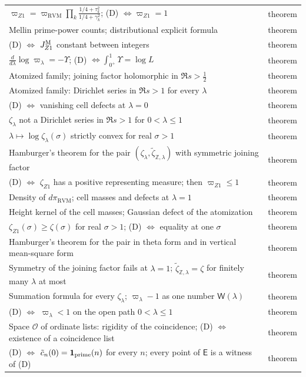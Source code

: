 \documentclass[11pt,reqno]{amsart}
\numberwithin{equation}{section}
\theoremstyle{plain}
\theoremstyle{definition}
\theoremstyle{remark}
\newcommand{\Z}{\mathbb Z}
\newcommand{\RVM}{\mathrm{RVM}}
\begin{document}
\begin{longtable}{p{}p{}}
$\varpi_{Z1}=\varpi_{\RVM}\prod_k\frac{1/4+\tau_k^2}{1/4+\gamma_k^2}$; (D) $\Leftrightarrow\varpi_{Z1}=1$ & theorem\\
Mellin prime-power counts; distributional explicit formula & theorem\\
(D) $\Leftrightarrow$ $J_{Z1}^{\rm M}$ constant between integers & theorem\\
$\frac d{d\lambda}\log\varpi_\lambda=-\Upsilon$; (D) $\Leftrightarrow\int_{0^+}^1\Upsilon=\log L$ & theorem\\
Atomized family; joining factor holomorphic in $\Re s>\frac12$ & theorem\\
Atomized family: Dirichlet series in $\Re s>1$ for every $\lambda$ & theorem\\
(D) $\Leftrightarrow$ vanishing cell defects at $\lambda=0$ & theorem\\
$\zeta_\lambda$ not a Dirichlet series in $\Re s>1$ for $0<\lambda\le1$ & theorem\\
$\lambda\mapsto\log\zeta_\lambda(\sigma)$ strictly convex for real $\sigma>1$ & theorem\\
Hamburger's theorem for the pair $(\zeta_\lambda,\tilde\zeta_{\Z,\lambda})$ with symmetric joining factor & theorem\\
(D) $\Leftrightarrow$ $\zeta_{Z1}$ has a positive representing measure; then $\varpi_{Z1}\le1$ & theorem\\
Density of $d\pi_{\RVM}$; cell masses and defects at $\lambda=1$ & theorem\\
Height kernel of the cell masses; Gaussian defect of the atomization & theorem\\
$\zeta_{Z1}(\sigma)\ge\zeta(\sigma)$ for real $\sigma>1$; (D) $\Leftrightarrow$ equality at one $\sigma$ & theorem\\
Hamburger's theorem for the pair in theta form and in vertical mean-square form & theorem\\
Symmetry of the joining factor fails at $\lambda=1$; $\tilde\zeta_{\Z,\lambda}=\zeta$ for finitely many $\lambda$ at most & theorem\\
Summation formula for every $\zeta_\lambda$; $\varpi_\lambda-1$ as one number $\mathsf W(\lambda)$ & theorem\\
(D) $\Leftrightarrow$ $\varpi_\lambda<1$ on the open path $0<\lambda\le1$ & theorem\\
Space $\mathscr O$ of ordinate lists: rigidity of the coincidence; (D) $\Leftrightarrow$ existence of a coincidence list & theorem\\
(D) $\Leftrightarrow$ $\tilde c_n(0)=\mathbf 1_{\rm prime}(n)$ for every $n$; every point of $\mathsf E$ is a witness of (D) & theorem\\

\end{longtable}
\end{document}
